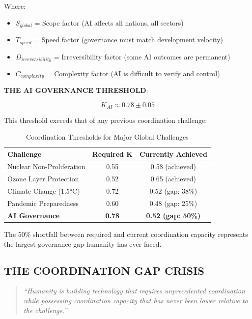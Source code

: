 \documentclass[11pt,letterpaper]{article}
\newcommand{\Kai}{K_{AI}}
\begin{document}
Where:
\begin{itemize}
\item $S_{global}$ = Scope factor (AI affects all nations, all sectors)
\item $T_{speed}$ = Speed factor (governance must match development velocity)
\item $D_{irreversibility}$ = Irreversibility factor (some AI outcomes are permanent)
\item $C_{complexity}$ = Complexity factor (AI is difficult to verify and control)
\end{itemize}

\textbf{THE AI GOVERNANCE THRESHOLD}:

\begin{equation}
\Kai \approx 0.78 \pm 0.05
\label{eq:threshold}
\end{equation}

This threshold exceeds that of any previous coordination challenge:

\begin{table}[H]
\centering
\caption{Coordination Thresholds for Major Global Challenges}
\begin{tabular}{lcc}
\toprule
\textbf{Challenge} & \textbf{Required K} & \textbf{Currently Achieved} \\
\midrule
Nuclear Non-Proliferation & 0.55 & 0.58 (achieved) \\
Ozone Layer Protection & 0.52 & 0.65 (achieved) \\
Climate Change (1.5°C) & 0.72 & 0.52 (gap: 38\%) \\
Pandemic Preparedness & 0.60 & 0.48 (gap: 25\%) \\
\textbf{AI Governance} & \textbf{0.78} & \textbf{0.52 (gap: 50\%)} \\
\bottomrule
\end{tabular}
\label{tab:thresholds}
\end{table}

The 50\% shortfall between required and current coordination capacity represents the largest governance gap humanity has ever faced.

\subsection{THE COORDINATION GAP CRISIS}

\begin{quote}
\textit{``Humanity is building technology that requires unprecedented coordination while possessing coordination capacity that has never been lower relative to the challenge.''}
\end{quote}
\end{document}
